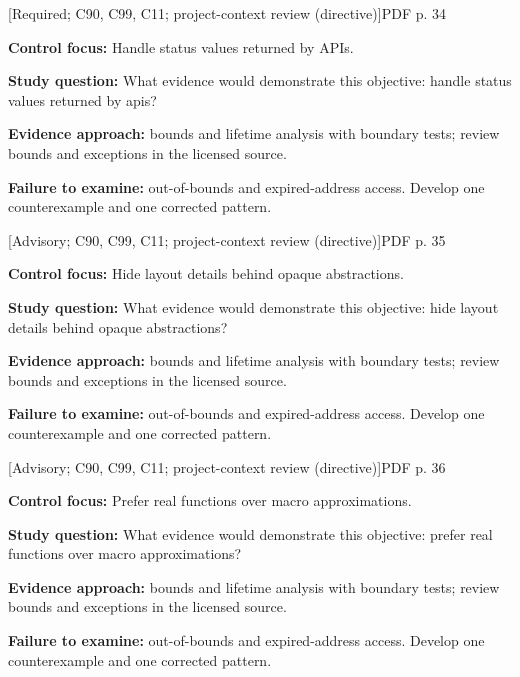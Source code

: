 \documentclass[10pt,letterpaper]{article}
\begin{document}
\smallskip
{}
 \textsf{\footnotesize [Required; C90, C99, C11; project-context review (directive)]}\hfill{\footnotesize PDF p. 34}\par
\textbf{Control focus:} Handle status values returned by APIs.\par
\textbf{Study question:} What evidence would demonstrate this objective: handle status values returned by apis?\par
\textbf{Evidence approach:} bounds and lifetime analysis with boundary tests; review bounds and exceptions in the licensed source.\par
\textbf{Failure to examine:} out-of-bounds and expired-address access. Develop one counterexample and one corrected pattern.\par
\smallskip
{}
 \textsf{\footnotesize [Advisory; C90, C99, C11; project-context review (directive)]}\hfill{\footnotesize PDF p. 35}\par
\textbf{Control focus:} Hide layout details behind opaque abstractions.\par
\textbf{Study question:} What evidence would demonstrate this objective: hide layout details behind opaque abstractions?\par
\textbf{Evidence approach:} bounds and lifetime analysis with boundary tests; review bounds and exceptions in the licensed source.\par
\textbf{Failure to examine:} out-of-bounds and expired-address access. Develop one counterexample and one corrected pattern.\par
\smallskip
{}
 \textsf{\footnotesize [Advisory; C90, C99, C11; project-context review (directive)]}\hfill{\footnotesize PDF p. 36}\par
\textbf{Control focus:} Prefer real functions over macro approximations.\par
\textbf{Study question:} What evidence would demonstrate this objective: prefer real functions over macro approximations?\par
\textbf{Evidence approach:} bounds and lifetime analysis with boundary tests; review bounds and exceptions in the licensed source.\par
\textbf{Failure to examine:} out-of-bounds and expired-address access. Develop one counterexample and one corrected pattern.\par
\smallskip
{}
\end{document}
